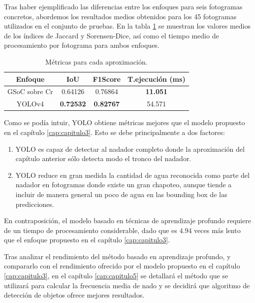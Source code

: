 Tras haber ejemplificado las diferencias entre los enfoques para seis fotogramas concretos, abordemos los resultados medios obtenidos para los 45 fotogramas utilizados en el conjunto de pruebas. En la tabla \ref{tab:metricasaproximaciones} se muestran los valores medios de los índices de Jaccard y Sorensen-Dice, así como el tiempo medio de procesamiento por fotograma para ambos enfoques. 

\begin{table}[]
    \centering
    \begin{tabular}{| c | c | c | c | } \hline
        Enfoque & IoU & F1Score  & T.ejecución (ms)  \\ \hline
        GSoC sobre Cr & 0.64126 & 0.76864 & \textbf{11.051} \\
        YOLOv4 & \textbf{0.72532} & \textbf{0.82767} & 54.571  \\ \hline
    \end{tabular}
    \caption{Métricas para cada aproximación.}
    \label{tab:metricasaproximaciones}
\end{table}

Como se podía intuir, YOLO obtiene métricas mejores que el modelo propuesto en el capítulo \ref{cap:capitulo3}. Esto se debe principalmente a dos factores:
\begin{enumerate}
    \item YOLO es capaz de detectar al nadador completo donde la aproximación del capítulo anterior sólo detecta modo el tronco del nadador.
    \item YOLO reduce en gran medida la cantidad de agua reconocida como parte del nadador en fotogramas donde existe un gran chapoteo, aunque tiende a incluir de manera general un poco de agua en las bounding box de las predicciones.
\end{enumerate}

En contraposición, el modelo basado en técnicas de aprendizaje profundo requiere de un tiempo de procesamiento considerable, dado que es 4.94 veces más lento que el enfoque propuesto en el capítulo \ref{cap:capitulo3}. 

Tras analizar el rendimiento del método basado en aprendizaje profundo, y compararlo con el rendimiento ofrecido por el modelo propuesto en el capítulo \ref{cap:capitulo3}, en el capítulo \ref{cap:capitulo5} se detallará el método que se utilizará para calcular la frecuencia media de nado y se decidirá que algoritmo de detección de objetos ofrece mejores resultados.


